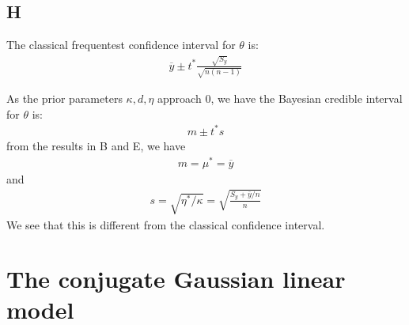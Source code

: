 \documentclass{article}
\begin{document}
\subsection*{H}
The classical frequentest confidence interval for \(\theta\) is:
\begin{align*}
\overline{y} \pm t^*\frac{\sqrt{S_y}}{\sqrt{n(n-1)}}
\end{align*}

As the prior parameters \(\kappa, d, \eta\) approach \(0\), we have the Bayesian credible interval for \(\theta\) is:
\begin{align*}
m \pm t^*s
\end{align*}
from the results in B and E, we have
\begin{align*}
m = \mu^* = \overline{y}
\end{align*}
and
\begin{align*}
s = \sqrt{\eta^*/\kappa} = \sqrt{\frac{S_y + \overline{y}/n}{n}}
\end{align*}
We see that this is different from the classical confidence interval.
\section{The conjugate Gaussian linear model}
\end{document}
